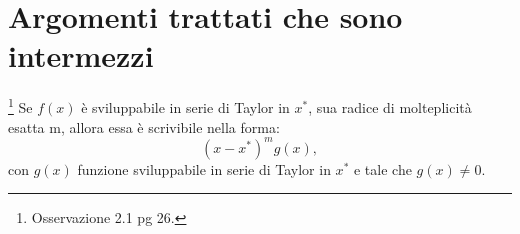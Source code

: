 \section{Argomenti trattati che sono intermezzi}
\begin{remark}\footnote{Osservazione 2.1 pg 26.}\label{rem:formaF}
Se $f(x)$ è sviluppabile in serie di Taylor in $x^*$, sua radice di molteplicità esatta m, allora essa è scrivibile nella forma:
\begin{equation}
    (x-x^*)^mg(x),
\end{equation}
con $g(x)$ funzione sviluppabile in serie di Taylor in $x^*$ e tale che $g(x)\neq 0$.
\end{remark}